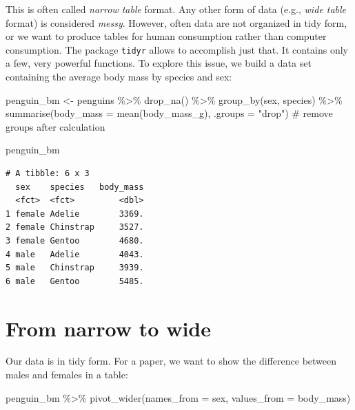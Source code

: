 \documentclass[
  letterpaper,
  DIV=11,
  numbers=noendperiod]{scrreprt}
\newenvironment{Shaded}{\begin{snugshade}}{\end{snugshade}}
\newcommand{\AttributeTok}[1]{\textcolor[rgb]{0.40,0.45,0.13}{#1}}
\newcommand{\CommentTok}[1]{\textcolor[rgb]{0.37,0.37,0.37}{#1}}
\newcommand{\FunctionTok}[1]{\textcolor[rgb]{0.28,0.35,0.67}{#1}}
\newcommand{\NormalTok}[1]{\textcolor[rgb]{0.00,0.23,0.31}{#1}}
\newcommand{\OtherTok}[1]{\textcolor[rgb]{0.00,0.23,0.31}{#1}}
\newcommand{\SpecialCharTok}[1]{\textcolor[rgb]{0.37,0.37,0.37}{#1}}
\newcommand{\StringTok}[1]{\textcolor[rgb]{0.13,0.47,0.30}{#1}}
\begin{document}
This is often called \emph{narrow table} format. Any other form of data
(e.g., \emph{wide table} format) is considered \emph{messy}. However,
often data are not organized in tidy form, or we want to produce tables
for human consumption rather than computer consumption. The package
\texttt{tidyr} allows to accomplish just that. It contains only a few,
very powerful functions. To explore this issue, we build a data set
containing the average body mass by species and sex:

\begin{Shaded}
\begin{Highlighting}[]
\NormalTok{penguin\_bm }\OtherTok{\textless{}{-}}\NormalTok{ penguins }\SpecialCharTok{\%\textgreater{}\%} 
  \FunctionTok{drop\_na}\NormalTok{() }\SpecialCharTok{\%\textgreater{}\%} 
  \FunctionTok{group\_by}\NormalTok{(sex, species) }\SpecialCharTok{\%\textgreater{}\%} 
  \FunctionTok{summarise}\NormalTok{(}\AttributeTok{body\_mass =} \FunctionTok{mean}\NormalTok{(body\_mass\_g), }\AttributeTok{.groups =} \StringTok{"drop"}\NormalTok{) }\CommentTok{\# remove groups after calculation}

\NormalTok{penguin\_bm}
\end{Highlighting}
\end{Shaded}

\begin{verbatim}
# A tibble: 6 x 3
  sex    species   body_mass
  <fct>  <fct>         <dbl>
1 female Adelie        3369.
2 female Chinstrap     3527.
3 female Gentoo        4680.
4 male   Adelie        4043.
5 male   Chinstrap     3939.
6 male   Gentoo        5485.
\end{verbatim}

\hypertarget{from-narrow-to-wide}{%
\section{From narrow to wide}\label{from-narrow-to-wide}}

Our data is in tidy form. For a paper, we want to show the difference
between males and females in a table:

\begin{Shaded}
\begin{Highlighting}[]
\NormalTok{penguin\_bm }\SpecialCharTok{\%\textgreater{}\%} 
  \FunctionTok{pivot\_wider}\NormalTok{(}\AttributeTok{names\_from =}\NormalTok{ sex, }\AttributeTok{values\_from =}\NormalTok{ body\_mass)}
\end{Highlighting}
\end{Shaded}
\end{document}
